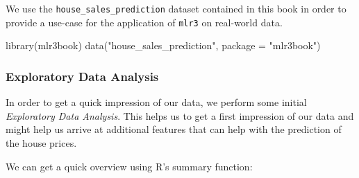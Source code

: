 \documentclass[]{article}
\newenvironment{Shaded}{}{}
\newcommand{\DataTypeTok}[1]{#1}
\newcommand{\KeywordTok}[1]{\textcolor[rgb]{0.00,0.00,1.00}{#1}}
\newcommand{\NormalTok}[1]{#1}
\newcommand{\StringTok}[1]{\textcolor[rgb]{0.00,0.50,0.50}{#1}}
\renewenvironment{Shaded} {\begin{snugshade}\small} {\end{snugshade}}
\begin{document}
We use the \texttt{house\_sales\_prediction} dataset contained in this book in order to provide a use-case for the application of \texttt{mlr3} on real-world data.

\begin{Shaded}
\begin{Highlighting}[]
\KeywordTok{library}\NormalTok{(mlr3book)}
\KeywordTok{data}\NormalTok{(}\StringTok{"house_sales_prediction"}\NormalTok{, }\DataTypeTok{package =} \StringTok{"mlr3book"}\NormalTok{)}
\end{Highlighting}
\end{Shaded}

\hypertarget{exploratory-data-analysis}{%
\subsubsection{Exploratory Data Analysis}\label{exploratory-data-analysis}}

In order to get a quick impression of our data, we perform some initial \emph{Exploratory Data Analysis}.
This helps us to get a first impression of our data and might help us arrive at additional features that can help with the prediction of the house prices.

We can get a quick overview using R's summary function:
\end{document}
